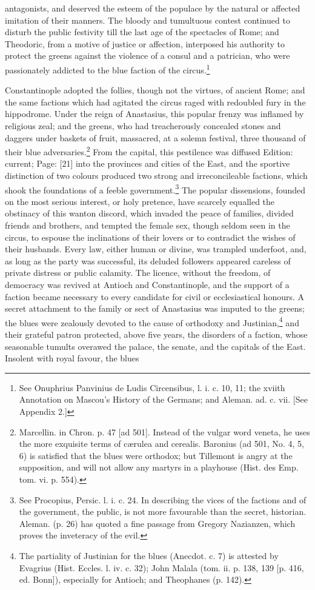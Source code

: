 antagonists, and deserved the esteem of the populace by the natural or affected imitation of their manners. The bloody and tumultuous contest continued to disturb the public festivity till the last age of the spectacles of Rome; and Theodoric, from a motive of justice or affection, interposed his authority to protect the greens against the violence of a consul and a patrician, who were passionately addicted to the blue faction of the circus.\footnote{See Onuphrius Panvinius de Ludis Circensibus, l. i. c. 10, 11; the xviith Annotation on Mascou\texthebrew{}’s History of the Germans; and Aleman. ad. c. vii. [See Appendix 2.]}

Constantinople adopted the follies, though not the virtues, of ancient Rome; and the same factions which had agitated the circus raged with redoubled fury in the hippodrome. Under the reign of Anastasius, this popular frenzy was inflamed by religious zeal; and the greens, who had treacherously concealed stones and daggers under baskets of fruit, massacred, at a solemn festival, three thousand of their blue adversaries.\footnote{Marcellin. in Chron. p. 47 [ad 501]. Instead of the vulgar word veneta, he uses the more exquisite terms of cærulea and cerealis. Baronius (ad 501, No. 4, 5, 6) is satisfied that the blues were orthodox; but Tillemont is angry at the supposition, and will not allow any martyrs in a playhouse (Hist. des Emp. tom. vi. p. 554).} From the capital, this pestilence was diffused Edition: current; Page: [21] into the provinces and cities of the East, and the sportive distinction of two colours produced two strong and irreconcileable factions, which shook the foundations of a feeble government.\footnote{See Procopius, Persic. l. i. c. 24. In describing the vices of the factions and of the government, the public, is not more favourable than the secret, historian. Aleman. (p. 26) has quoted a fine passage from Gregory Nazianzen, which proves the inveteracy of the evil.} The popular dissensions, founded on the most serious interest, or holy pretence, have scarcely equalled the obstinacy of this wanton discord, which invaded the peace of families, divided friends and brothers, and tempted the female sex, though seldom seen in the circus, to espouse the inclinations of their lovers or to contradict the wishes of their husbands. Every law, either human or divine, was trampled underfoot, and, as long as the party was successful, its deluded followers appeared careless of private distress or public calamity. The licence, without the freedom, of democracy was revived at Antioch and Constantinople, and the support of a faction became necessary to every candidate for civil or ecclesiastical honours. A secret attachment to the family or sect of Anastasius was imputed to the greens; the blues were zealously devoted to the cause of orthodoxy and Justinian,\footnote{The partiality of Justinian for the blues (Anecdot. c. 7) is attested by Evagrius (Hist. Eccles. l. iv. c. 32); John Malala (tom. ii. p. 138, 139 [p. 416, ed. Bonn]), especially for Antioch; and Theophanes (p. 142).} and their grateful patron protected, above five years, the disorders of a faction, whose seasonable tumults overawed the palace, the senate, and the capitals of the East. Insolent with royal favour, the blues 